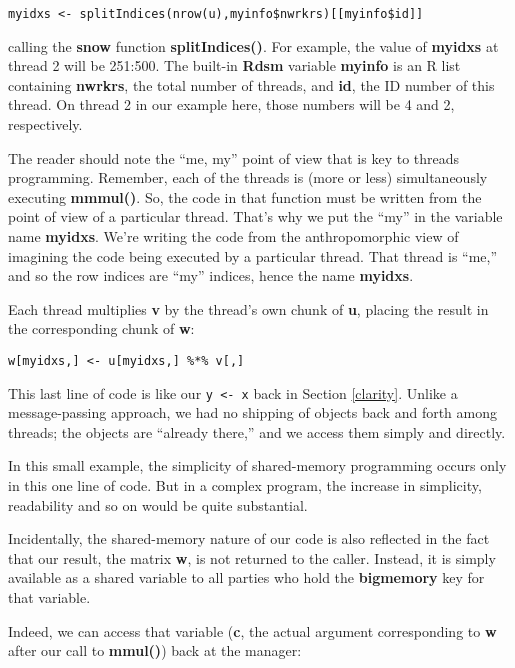 \documentclass[11pt]{article}
\begin{document}
\begin{lstlisting}
myidxs <- splitIndices(nrow(u),myinfo$nwrkrs)[[myinfo$id]]
\end{lstlisting}

calling the {\bf snow} function {\bf splitIndices()}.  For example, the
value of {\bf myidxs} at thread 2 will be 251:500.  The built-in {\bf Rdsm}
variable {\bf myinfo} is an R list containing {\bf nwrkrs}, the total
number of threads, and {\bf id}, the ID number of this thread.  On thread
2 in our example here, those numbers will be 4 and 2, respectively.

The reader should note the ``me, my'' point of view that is key to
threads programming.  Remember, each of the threads is (more or less)
simultaneously executing {\bf mmmul()}.  So, the code in that function
must be written from the point of view of a particular thread.  That's
why we put the ``my'' in the variable name {\bf myidxs}.  We're writing
the code from the anthropomorphic view of imagining the code being
executed by a particular thread.  That thread is ``me,'' and so the row
indices are ``my'' indices, hence the name {\bf myidxs}.

Each thread multiplies {\bf v} by the thread's own chunk of {\bf u},
placing the result in the corresponding chunk of {\bf w}:

\begin{lstlisting}
w[myidxs,] <- u[myidxs,] %*% v[,]
\end{lstlisting}

This last line of code is like our \lstinline{y <- x} back in Section
\ref{clarity}.  Unlike a message-passing approach, we had no shipping of
objects back and forth among threads; the objects are ``already there,''
and we access them simply and directly.  

In this small example, the simplicity of shared-memory programming
occurs only in this one line of code.  But in a complex program, the
increase in simplicity, readability and so on would be quite
substantial.

Incidentally, the shared-memory nature of our code is also reflected in
the fact that our result, the matrix {\bf w}, is not returned to the
caller.  Instead, it is simply available as a shared variable to all
parties who hold the {\bf bigmemory} key for that variable.

Indeed, we can access that variable ({\bf c}, the actual argument
corresponding to {\bf w} after our call to {\bf mmul()}) back at the 
manager:
\end{document}
